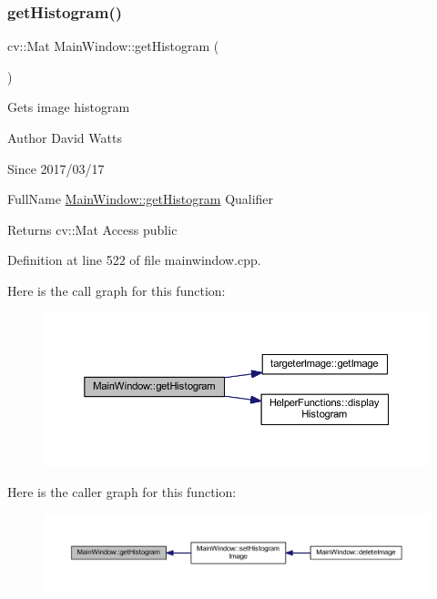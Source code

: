 \subsubsection{\texorpdfstring{get\+Histogram()}{getHistogram()}}
{\footnotesize\ttfamily cv\+::\+Mat Main\+Window\+::get\+Histogram (\begin{DoxyParamCaption}{ }\end{DoxyParamCaption})}

Gets image histogram

\begin{DoxyAuthor}{Author}
David Watts 
\end{DoxyAuthor}
\begin{DoxySince}{Since}
2017/03/17
\end{DoxySince}
Full\+Name \hyperlink{class_main_window_a2734ce9308b5847a561f00b2fc9066aa}{Main\+Window\+::get\+Histogram} Qualifier \begin{DoxyReturn}{Returns}
cv\+::\+Mat Access public 
\end{DoxyReturn}


Definition at line 522 of file mainwindow.\+cpp.

Here is the call graph for this function\+:
\nopagebreak
\begin{figure}[H]
\begin{center}
\leavevmode
\includegraphics[width=350pt]{class_main_window_a2734ce9308b5847a561f00b2fc9066aa_cgraph}
\end{center}
\end{figure}
Here is the caller graph for this function\+:
\nopagebreak
\begin{figure}[H]
\begin{center}
\leavevmode
\includegraphics[width=350pt]{class_main_window_a2734ce9308b5847a561f00b2fc9066aa_icgraph}
\end{center}
\end{figure}
\mbox{\label{class_main_window_acc35ff9a0c04d62297e7fd219fa869e5}} 
